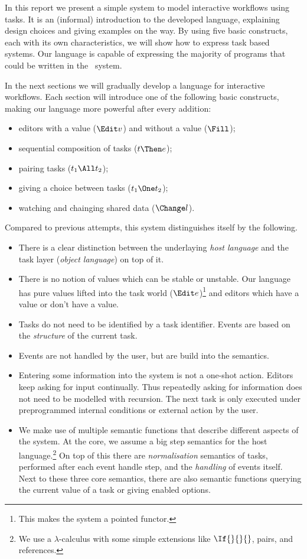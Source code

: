 
In this report we present a simple system to model interactive workflows using tasks.
It is an (informal) introduction to the developed language,
explaining design choices and giving examples on the way.
By using five basic constructs,
each with its own characteristics,
we will show how to express task based systems.
Our language is capable of expressing the majority of programs that could be written in the \ITASKS\ system.

In the next sections we will gradually develop a language for interactive workflows.
Each section will introduce one of the following basic constructs,
making our language more powerful after every addition:
\begin{itemize}
  \item editors with a value ($\Edit v$) and without a value ($\Fill$);
  \item sequential composition of tasks ($t \Then e$);
  \item pairing tasks ($t_1 \All t_2$);
  \item giving a choice between tasks ($t_1 \One t_2$);
  \item watching and chainging shared data ($\Change l$).
\end{itemize}

Compared to previous attempts,
this system distinguishes itself by the following.
\begin{itemize}
  \item
    There is a clear distinction between the underlaying \emph{host language} and the task layer (\emph{object language}) on top of it.
  \item
    There is no notion of values which can be stable or unstable.
    Our language has pure values lifted into the task world ($\Edit e$)\footnote{
      This makes the system a pointed functor.}
    and editors which have a value or don't have a value.
  \item
    Tasks do not need to be identified by a task identifier.
    Events are based on the \emph{structure} of the current task.
  \item
    Events are not handled by the user, but are build into the semantics.
  \item
    Entering some information into the system is not a one-shot action.
    Editors keep asking for input continually.
    Thus repeatedly asking for information does not need to be modelled with recursion.
    The next task is only executed under preprogrammed internal conditions or external action by the user.
  \item
    We make use of multiple semantic functions that describe different aspects of the system.
    At the core, we assume a big step semantics for the host language.\footnote{
      We use a $\lambda$-calculus with some simple extensions like $\If{}{}{}$, pairs, and references.}
    On top of this there are \emph{normalisation} semantics of tasks,
    performed after each event handle step,
    and the \emph{handling} of events itself.
    Next to these three core semantics,
    there are also semantic functions querying the current value of a task
    or giving enabled options.
\end{itemize}

